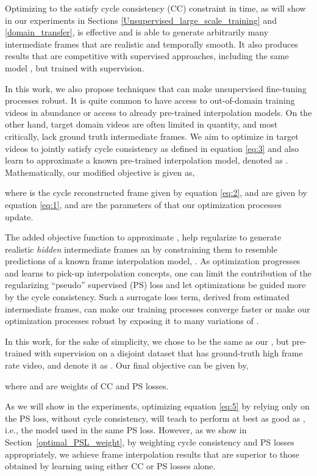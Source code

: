 \documentclass[10pt,twocolumn,letterpaper]{article}
\begin{document}
Optimizing  to the satisfy cycle consistency (CC) constraint in time, as will show in our experiments in Sections  \ref{Unsupervised_large_scale_training} and \ref{domain_transfer}, is effective and is able to generate arbitrarily many intermediate frames that are realistic and temporally smooth. It also produces results that are competitive with supervised approaches, including the same model , but trained with supervision.

In this work, we also propose techniques that can make unsupervised fine-tuning processes robust. It is quite common to have access to out-of-domain training videos in abundance or access to already pre-trained interpolation models. On the other hand, target domain videos are often limited in quantity, and most critically, lack ground truth intermediate frames. We aim to optimize  in target videos to jointly satisfy cycle consistency as defined in equation \ref{eq:3} and also learn to approximate a known pre-trained interpolation model, denoted as . Mathematically, our modified objective is given as,

where  is the cycle reconstructed frame given by equation \ref{eq:2},  and  are given by equation \ref{eq:1}, and   are the parameters of  that our optimization processes update. 

The added objective function to approximate , help regularize  to generate realistic \textit{hidden} intermediate frames  an  by constraining them to resemble predictions of a known frame interpolation model, . As optimization progresses and  learns to pick-up interpolation concepts, one can limit the contribution of the regularizing ``pseudo'' supervised (PS) loss and let optimizations be guided more by the cycle consistency. Such a surrogate loss term, derived from estimated intermediate frames, can make our training processes converge faster or make our optimization processes robust by exposing it to many variations of .

In this work, for the sake of simplicity, we chose  to be the same as our , but pre-trained with supervision on a disjoint dataset that has ground-truth high frame rate video, and denote it as . Our final objective can be given by,

\noindent where  and  are weights of CC and PS losses.

As we will show in the experiments, optimizing equation \ref{eq:5} by relying only on the PS loss, without cycle consistency, will teach  to perform at best as good as , i.e., the model used in the same PS loss. However, as we show in Section~\ref{optimal_PSL_weight}, by weighting cycle consistency and PS losses appropriately, we achieve frame interpolation results that are superior to those obtained by learning using either CC or PS losses alone.
\end{document}
